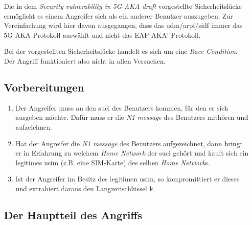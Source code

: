 Die in dem \textit{Security vulnerability in 5G-AKA draft} vorgestellte Sicherheitslücke ermöglicht es einem Angreifer sich als ein anderer Benutzer auszugeben. %
Zur Vereinfachung wird hier davon ausgegangen, dass das \gls{udm}/\gls{arpf}/\gls{sidf} immer das 5G-AKA Protokoll auswählt und nicht das EAP-AKA' Protokoll.

Bei der vorgestellten Sicherheitslücke  handelt es sich um eine \textit{Race Condition}.
Der Angriff funktioniert also nicht in allen Versuchen.

\subsection{Vorbereitungen}

\begin{enumerate}
\item Der Angreifer muss an den \gls{suci} des Benutzers kommen, für den er sich ausgeben möchte.
Dafür muss er die \textit{N1 message} des Benutzers mithören und aufzeichnen.

\item Hat der Angreifer die \textit{N1 message} des Benutzers aufgezeichnet, dann bringt er in Erfahrung zu welchem \textit{Home Network} der \gls{suci} gehört und kauft sich ein legitimes \gls{usim} (z.B. eine SIM-Karte) des selben \textit{Home Network}s.

\item Ist der Angreifer im Besitz des legitimen \gls{usim}, so kompromittiert er dieses und extrahiert daraus den Langzeitschlüssel \gls{k}.

\end{enumerate}

\subsection{Der Hauptteil des Angriffs}

